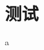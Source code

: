 \documentclass[]{YNUthesis}
\begin{document}
\tableofcontents
\chapter{测试}
a
\zhlipsum[10]
\end{document}
